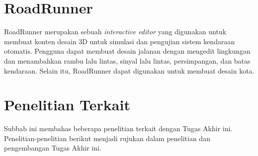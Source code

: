 \section{RoadRunner}
RoadRunner merupakan sebuah \textit{interactive editor} yang digunakan untuk
membuat konten desain 3D untuk simulasi dan pengujian sistem kendaraan otomatis.
Pengguna dapat membuat desain jalanan dengan mengedit lingkungan dan menambahkan
rambu lalu lintas, sinyal lalu lintas, persimpangan, dan batas kendaraan. Selain
itu, RoadRunner dapat digunakan untuk membuat desain kota.

\section{Penelitian Terkait}
Subbab ini membahas beberapa penelitian terkait dengan Tugas Akhir ini.
Penelitian-penelitian berikut menjadi rujukan dalam penelitian dan pengembangan
Tugas Akhir ini.




